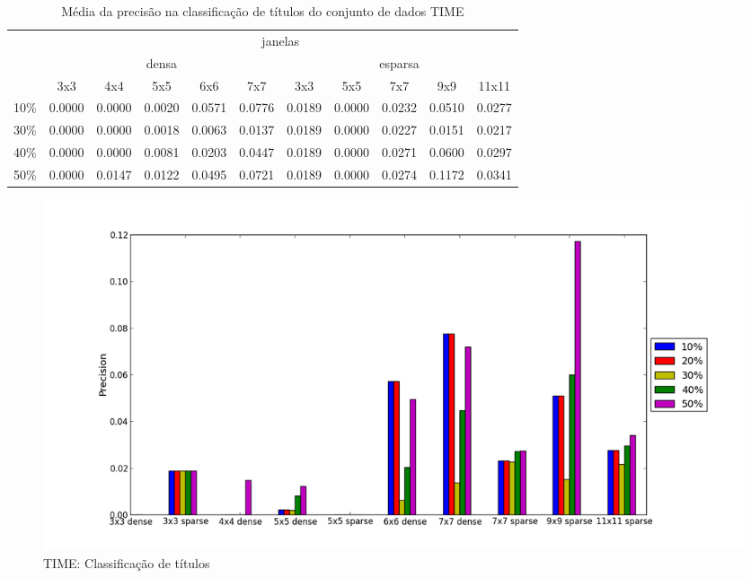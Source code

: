 \documentclass[a4paper,11pt]{article}
\begin{document}
  \begin{center}
    \begin{table}[p]
      \caption{Média da precisão na classificação de títulos do conjunto de dados TIME}
      \begin{tabular}{ l | c c c c c || c c c c c | }
        \cline{2-11}
        & \multicolumn{10}{|c|}{janelas} \\
        \cline{2-11}
        & \multicolumn{5}{c||}{densa} & \multicolumn{5}{c|}{esparsa} \\
        \cline{2-11}
        & 3x3 & 4x4 & 5x5 & 6x6 & 7x7 & 3x3 & 5x5 & 7x7 & 9x9 & 11x11 \\
        \hline
        \multicolumn{1}{|l|}{10\%}& 0.0000& 0.0000& 0.0020& 0.0571& 0.0776& 0.0189& 0.0000& 0.0232& 0.0510& 0.0277\\
        \multicolumn{1}{|l|}{30\%}& 0.0000& 0.0000& 0.0018& 0.0063& 0.0137& 0.0189& 0.0000& 0.0227& 0.0151& 0.0217\\
        \multicolumn{1}{|l|}{40\%}& 0.0000& 0.0000& 0.0081& 0.0203& 0.0447& 0.0189& 0.0000& 0.0271& 0.0600& 0.0297\\
        \multicolumn{1}{|l|}{50\%}& 0.0000& 0.0147& 0.0122& 0.0495& 0.0721& 0.0189& 0.0000& 0.0274& 0.1172& 0.0341\\
        \hline  
      \end{tabular}
    \end{table}
  \end{center}
    
  \begin{figure}[p]
    \centerline{\includegraphics[width=1.2\textwidth]{assets/experiment_charts/time_TextRegion_heading_precision.png}}
    \caption{TIME: Classificação de títulos}
    \label{fig:time_TextRegion_heading_precision}
  \end{figure}
\end{document}
